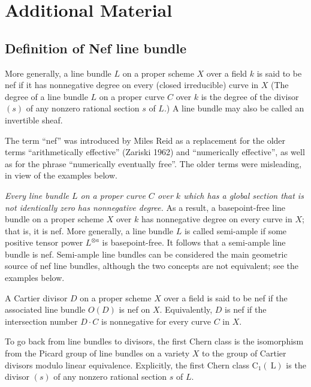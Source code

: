 \documentclass[lang=en,12pt]{beautybook}
\begin{document}
\begin{solution}
\begin{enumerate}
    \end{enumerate}
\end{solution}


\section*{Additional Material}
\subsection*{Definition of Nef line bundle}
\begin{definition}
    More generally, a line bundle $L$ on a proper scheme $X$ over a field $k$ is said to be nef if it has nonnegative degree on every (closed irreducible) curve in $X$ (The degree of a line bundle $L$ on a proper curve $C$ over $k$ is the degree of the divisor $(s)$ of any nonzero rational section $s$ of $L$.) A line bundle may also be called an invertible sheaf.
\end{definition}

The term ``nef'' was introduced by Miles Reid as a replacement for the older terms ``arithmetically effective'' (Zariski 1962) and ``numerically effective'', as well as for the phrase ``numerically eventually free''. The older terms were misleading, in view of the examples below.

\textit{Every line bundle $L$ on a proper curve $C$ over $k$ which has a global section that is not identically zero has nonnegative degree.} As a result, a basepoint-free line bundle on a proper scheme $X$ over $k$ has nonnegative degree on every curve in $X$; that is, it is nef.  More generally, a line bundle $L$ is called semi-ample if some positive tensor power $L^{\otimes a}$ is basepoint-free. It follows that a semi-ample line bundle is nef. Semi-ample line bundles can be considered the main geometric source of nef line bundles, although the two concepts are not equivalent; see the examples below.

A Cartier divisor $D$ on a proper scheme $X$ over a field is said to be nef if the associated line bundle $O(D)$ is nef on $X$. Equivalently, $D$ is nef if the intersection number $D \cdot C$ is nonnegative for every curve $C$ in $X$.

To go back from line bundles to divisors, the first Chern class is the isomorphism from the Picard group of line bundles on a variety $X$ to the group of Cartier divisors modulo linear equivalence. Explicitly, the first Chern class $\mathrm{C}_1(\mathrm{~L})$ is the divisor $(s)$ of any nonzero rational section $s$ of $L$.
\end{document}
